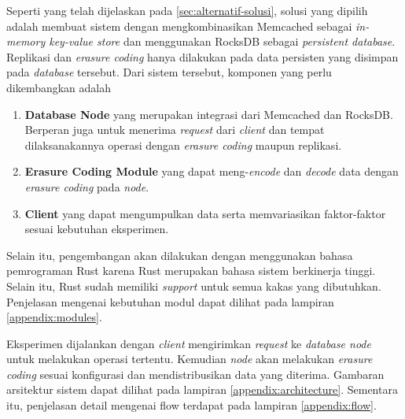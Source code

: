 
Seperti yang telah dijelaskan pada \ref{sec:alternatif-solusi}, solusi yang dipilih adalah membuat sistem dengan mengkombinasikan Memcached sebagai \textit{in-memory key-value store} dan menggunakan RocksDB sebagai \textit{persistent database}. Replikasi dan \textit{erasure coding} hanya dilakukan pada data persisten yang disimpan pada \textit{database} tersebut. Dari sistem tersebut, komponen yang perlu dikembangkan adalah
\begin{enumerate}
  \item \textbf{Database Node} yang merupakan integrasi dari Memcached dan RocksDB. Berperan juga untuk menerima \textit{request} dari \textit{client} dan tempat dilaksanakannya operasi dengan \textit{erasure coding} maupun replikasi.
  \item \textbf{Erasure Coding Module} yang dapat meng-\textit{encode} dan \textit{decode} data dengan \textit{erasure coding} pada \textit{node}.
  \item \textbf{Client} yang dapat mengumpulkan data serta memvariasikan faktor-faktor sesuai kebutuhan eksperimen.
\end{enumerate}

Selain itu, pengembangan akan dilakukan dengan menggunakan bahasa pemrograman Rust karena Rust merupakan bahasa sistem berkinerja tinggi. Selain itu, Rust sudah memiliki \textit{support} untuk semua kakas yang dibutuhkan. Penjelasan mengenai kebutuhan modul dapat dilihat pada lampiran \ref{appendix:modules}.

Eksperimen dijalankan dengan \textit{client} mengirimkan \textit{request} ke \textit{database node} untuk melakukan operasi tertentu. Kemudian \textit{node} akan melakukan \textit{erasure coding} sesuai konfigurasi dan mendistribusikan data yang diterima. Gambaran arsitektur sistem dapat dilihat pada lampiran \ref{appendix:architecture}. Sementara itu, penjelasan detail mengenai flow terdapat pada lampiran \ref{appendix:flow}.
  